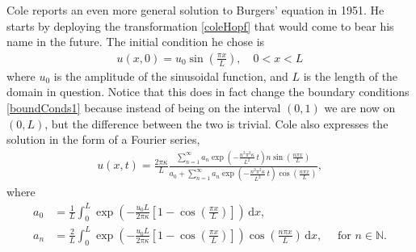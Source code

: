 \documentclass[undefended]{sfuthesis}
\begin{document}
Cole \cite{cole} reports an even more general solution to Burgers' equation in 1951. He starts by deploying the transformation \eqref{coleHopf} that would come to bear his name in the future. The initial condition he chose is
\begin{align*}
u(x, 0) = u_0 \sin \left(\frac{\pi x}{L}\right), \quad 0 < x < L
\end{align*}
where $u_0$ is the amplitude of the sinusoidal function, and $L$ is the length of the domain in question. Notice that this does in fact change the boundary conditions \eqref{boundConds1} because instead of being on the interval $(0, 1)$ we are now on $(0, L)$, but the difference between the two is trivial. Cole also expresses the solution in the form of a Fourier series,
\begin{align*}
u(x, t) = \frac{2 \pi \kappa}{L}\frac{\sum\limits_{n = 1}^{\infty} a_n \exp\left(-\frac{n^2 \pi^2 \kappa }{L^2}\,t\right) n \sin \left(\frac{n \pi x}{L}\right)}{a_0 + \sum\limits_{n = 1}^{\infty} a_n \exp\left(-\frac{n^2 \pi^2 \kappa }{L^2}\,t\right) \cos \left(\frac{n \pi x}{L}\right)},
\end{align*}
where
\begin{align*}
a_0 &= \frac{1}{L}\int_{0}^{L} \exp \left(-\frac{u_0 L}{2 \pi \kappa}\left[1 - \cos \left(\frac{\pi x}{L}\right)\right]\right)\,\mathrm{d}x,\\
a_n &= \frac{2}{L}\int_{0}^{L} \exp \left(-\frac{u_0 L}{2 \pi \kappa}\left[1 - \cos \left(\frac{\pi x}{L}\right)\right]\right) \cos \left(\frac{n \pi x}{L}\right) \,\mathrm{d}x, \quad \text{ for } n \in \mathbb{N}.
\end{align*}
\end{document}
